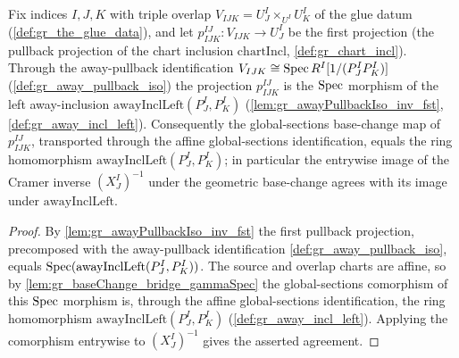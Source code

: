 \begin{lemma}\leanok
  \label{lem:gr_baseChange_bridge_left}
  Fix indices \(I, J, K\) with triple overlap \(V_{IJK} = U^I_J \times_{U^I} U^I_K\) of the glue
  datum (\cref{def:gr_the_glue_data}), and let
  \(p^{IJ}_{IJK} : V_{IJK} \to U^I_J\) be the first projection (the pullback projection of the
  chart inclusion \(\mathrm{chartIncl}\), \cref{def:gr_chart_incl}). Through the away-pullback
  identification \(V_{IJK} \cong \operatorname{Spec} R^I[1/(P^I_J P^I_K)]\) (\cref{def:gr_away_pullback_iso})
  the projection \(p^{IJ}_{IJK}\) is the \(\operatorname{Spec}\) morphism of the left away-inclusion
  \(\mathrm{awayInclLeft}(P^I_J, P^I_K)\) (\cref{lem:gr_awayPullbackIso_inv_fst},
  \cref{def:gr_away_incl_left}). Consequently the global-sections base-change map of
  \(p^{IJ}_{IJK}\), transported through the affine global-sections identification, equals the
  ring homomorphism \(\mathrm{awayInclLeft}(P^I_J, P^I_K)\); in particular the entrywise image of
  the Cramer inverse \((X^I_J)^{-1}\) under the geometric base-change agrees with its image under
  \(\mathrm{awayInclLeft}\).
\end{lemma}
\begin{proof}
  By \cref{lem:gr_awayPullbackIso_inv_fst} the first pullback projection, precomposed with the
  away-pullback identification \cref{def:gr_away_pullback_iso}, equals
  \(\operatorname{Spec}(\mathrm{awayInclLeft}(P^I_J, P^I_K))\). The source and overlap charts are affine, so by
  \cref{lem:gr_baseChange_bridge_gammaSpec} the global-sections comorphism of this \(\operatorname{Spec}\)
  morphism is, through the affine global-sections identification, the ring homomorphism
  \(\mathrm{awayInclLeft}(P^I_J, P^I_K)\) (\cref{def:gr_away_incl_left}). Applying the comorphism
  entrywise to \((X^I_J)^{-1}\) gives the asserted agreement.
\end{proof}


